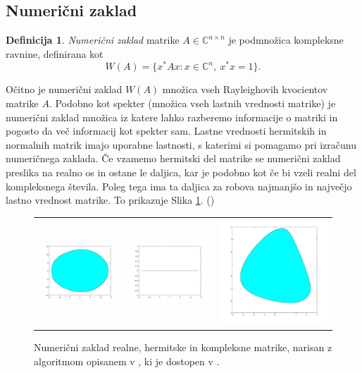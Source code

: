 \documentclass[12pt,a4paper]{amsart}
\theoremstyle{definition}
\newtheorem{definicija}{Definicija}[section]
\theoremstyle{plain}
\newcommand{\C}{\mathbb C}
\begin{document}
\subsection{Numerični zaklad}
\begin{definicija}
\emph{Numerični zaklad} matrike $A \in \C^{n\times n}$ je pod\-mno\-ži\-ca kompleksne ravnine, definirana kot
$$W(A)=\{x^\ast Ax\! : x \in \C^n,\ x^\ast x=1\}.$$
\end{definicija}
Očitno je numerični zaklad $W(A)$ množica vseh Rayleighovih kvocientov matrike $A$. Podobno kot spekter (množica vseh lastnih vrednosti matrike) je numerični zaklad množica iz katere lahko razberemo informacije o matriki in pogosto da več informacij kot spekter sam.
Lastne vrednosti hermitskih in normalnih matrik imajo uporabne lastnosti, s katerimi si pomagamo pri izračunu numeričnega zaklada.
Če vzamemo hermitski del matrike se numerični zaklad preslika na realno os in ostane le daljica, kar je podobno kot če bi vzeli realni del kompleksnega števila. Poleg tega ima ta daljica za robova najmanjšo in največjo lastno vrednost matrike.
To prikazuje Slika \ref{fig:zaklad}. (\cite{zaloga})\\
\begin{figure} [h]
\begin{tabular}{lll}
\includegraphics[width=.225\textwidth]{real.jpg}
&
\includegraphics[width=.225\textwidth]{hermit.jpg}
&
\includegraphics[width=.225\textwidth]{kompleks.jpg}
\end{tabular}
\caption{Numerični zaklad realne, hermitske in kompleksne matrike, narisan z algoritmom opisanem v \cite{zaloga}, ki je dostopen v \cite{nr}.}
\label{fig:zaklad}
\end{figure}
\end{document}

